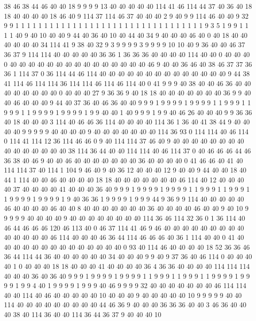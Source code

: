 38 46 38 44 46 40 40 18 9 9 9 9 13 40 40 40 40 40 114 41
46 114 44 37 40 36 40 18 18 40 40 40 40 18 46 40 9 114 37 114
46 37 40 40 40 2 9 40 9 9 114 46 40 40 9 32 9 9 1 1
1 1 1 1 1 1 1 1 1 1 1 1 1 1 1 1 1 1 1 1
1 1 1 1 1 1 1 1 1 1 1 9 3 5 1 9 9 1 1 1
1 40 9 40 10 40 40 9 44 40 36 40 10 40 44 40 34 9 40 40
40 46 40 0 40 18 40 40 40 40 40 40 34 114 41 9 38 40 32 9
3 9 9 9 9 3 9 9 9 9 10 10 40 9 36 40 40 46 37 36
37 9 114 114 40 40 40 40 40 36 36 1 36 36 36 40 40 40 40 114
40 40 0 40 40 40 0 40 40 40 40 40 40 40 40 40 40 40 40 40
40 40 46 9 40 40 36 46 40 38 46 37 37 36 36 1 114 37 0 36
114 44 46 114 40 40 40 40 40 40 40 40 40 40 40 40 40 40 9 44
38 41 114 46 114 114 36 114 114 46 114 46 114 40 0 41 9 9 9 40
38 40 40 46 36 40 40 40 40 40 40 40 40 0 40 40 40 27 9 36
36 9 40 18 18 40 40 40 40 40 40 40 36 9 9 40 40 46 40 40
40 9 44 40 37 36 40 46 36 40 40 9 9 9 1 9 9 9 9 1
9 9 9 9 1 1 9 9 9 1 1 9 9 9 1 1 9 9 9 9
1 9 9 9 9 1 9 9 40 40 1 40 9 9 9 1 9 9 40 46
26 40 40 40 9 9 36 36 40 18 40 40 40 3 114 40 46 46 36 114
40 40 40 40 114 36 1 36 40 41 38 44 9 40 40 40 40 9 9 9
9 9 40 40 40 40 9 40 40 40 40 40 40 40 114 36 93 0 114 114
40 46 114 0 114 41 114 12 36 114 46 46 0 9 40 114 114 37 46 40
9 40 40 40 40 40 40 40 40 40 40 40 40 40 40 40 38 114 36 44
40 40 114 114 40 46 114 37 0 40 46 46 46 44 46 36 38 40 46 9
40 40 46 40 40 40 40 40 40 40 36 40 40 40 40 0 41 46 46 40
41 40 114 114 37 40 114 1 104 9 46 40 9 40 36 12 40 40 40 12
9 40 40 9 44 40 40 18 40 44 1 114 40 40 46 40 40 40 40 18
18 40 40 40 40 40 40 40 46 114 40 12 40 40 40 40 37 40 40 40
40 41 40 40 40 36 40 9 9 9 1 9 9 9 9 1 9 9 9 9
1 1 9 9 9 1 1 9 9 9 1 1 9 9 9 9 1 9 9 9
9 1 9 40 36 36 1 9 9 9 9 1 9 9 9 44 9 36 9 9
114 40 40 40 40 40 46 40 40 40 40 46 40 40 8 40 40 40 40 40
40 40 36 40 40 40 40 46 40 40 9 40 10 9 9 9 9 9 40 40
40 40 9 40 40 40 40 40 40 40 40 114 36 46 114 32 36 0 1 36
114 40 46 44 46 46 46 120 46 113 40 0 46 37 114 41 46 9 46 40
40 40 40 40 40 40 40 40 40 40 40 40 40 46 114 40 40 40 46 36
44 114 46 46 46 40 36 1 114 40 40 0 41 40 40 40 40 40 40 40
40 40 40 40 40 40 40 0 93 40 114 46 40 40 40 40 18 52 36 36
46 36 44 114 44 36 40 40 40 40 40 40 34 40 40 40 9 9 40 9
37 36 40 46 114 0 40 40 40 40 1 0 40 40 40 18 18 40 40 40
41 40 40 40 40 36 4 36 36 40 40 40 40 114 114 114 40 40 40 36
40 36 40 9 9 9 1 9 9 9 9 1 9 9 9 9 1 1 9 9
9 1 1 9 9 9 1 1 9 9 9 9 1 9 9 9 9 1 9 9
4 40 1 9 9 9 9 1 9 9 9 40 46 9 9 9 9 32 40 40
40 40 40 40 40 46 114 114 40 40 114 40 46 40 40 40 40 40 10 40
40 40 9 40 40 40 40 40 10 9 9 9 9 9 40 40 114 40 40 40
40 40 40 40 40 40 44 46 36 9 40 40 40 36 36 36 40 40 3 46
36 40 40 40 38 40 114 36 40 40 114 36 44 36 37 9 40 40 40 10
